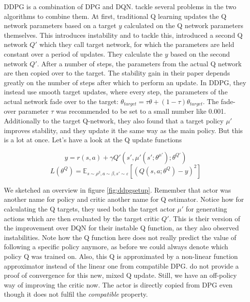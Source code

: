 \documentclass[hyperref,german,beleg]{cgvpub}
\begin{document}
\ac{DDPG} is a combination of \ac{DPG} and \ac{DQN}. \cite{lillicrapCONTINUOUSCONTROLDEEP2015} tackle several problems in the two algorithms to combine them. At first, traditional Q learning updates the Q network parameters based on a target $y$ calculated on the Q network parameters themselves. This introduces instability and to tackle this, \cite{mnihPlayingAtariDeep2013} introduced a second Q network $Q'$ which they call target network, for which the parameters are held constant over a period of updates. They calculate the $y$ based on the second network $Q'$. After a number of steps, the parameters from the actual Q network are then copied over to the target. The stability gain in their paper depends greatly on the number of steps after which to perform an update. In \ac{DDPG}, they instead use smooth target updates, where every step, the parameters of the actual network fade over to the target: $\theta_{target} = \tau \theta + (1 - \tau) \theta_{target}$. The fade-over parameter $\tau$ was recommended to be set to a small number like 0.001. Additionally to the target Q-network, they also found that a target policy $\mu'$ improves stability, and they update it the same way as the main policy. But this is a lot at once. Let's have a look at the Q update functions

\begin{equation}
y = r(s, a) + \gamma Q'(s', \mu'(s';\theta^{\mu'});\theta^{Q'})
\end{equation}
\begin{equation}
L(\theta^Q) = \mathbb{E}_{s \sim \rho^{\beta}, a \sim \beta, s' \sim \varepsilon}[(Q(s, a;\theta^Q) - y)^2]
\end{equation}


We sketched an overview in figure \ref{fig:ddpgsetup}. Remember that actor was another name for policy and critic another name for Q estimator. Notice how for calculating the Q targets, they used both the target actor $\mu'$ for generating actions which are then evaluated by the target critic $Q'$. This is their version of the improvement over \ac{DQN} for their instable Q function, as they also observed instabilities. Note how the Q function here does not really predict the value of following a specific policy anymore, as before we could always denote which policy Q was trained on. Also, this Q is approximated by a non-linear function approximator instead of the linear one from compatible \ac{DPG}. \cite{lillicrapCONTINUOUSCONTROLDEEP2015} do not provide a proof of convergence for this new, mixed Q update. Still, we have an off-policy way of improving the critic now. The actor is directly copied from \ac{DPG} even though it does not fulfil the \textit{compatible} property.
\end{document}
